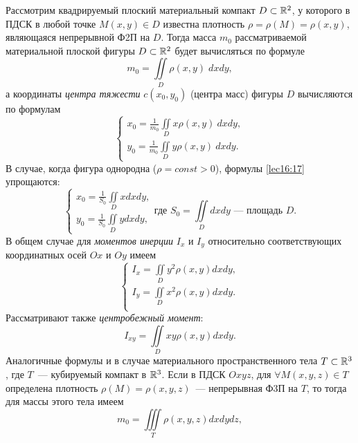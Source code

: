 \documentclass[../../main.tex]{subfiles}
\begin{document}
Рассмотрим квадрируемый плоский материальный компакт
$D \subset \mathbb{R}^{2}$, у которого в ПДСК в любой точке $M(x, y) \in D$ известна
плотность $\rho = \rho(M) = \rho(x,y)$, являющаяся непрерывной Ф2П на $D$. 
Тогда
масса $m_0$ рассматриваемой материальной плоской фигуры $D \subset \mathbb{R}^{2}$
будет вычисляться по формуле
\begin{equation}
\label{lec16:15}
m_0 = \iint\limits_D \rho(x, y) \; dxdy,
\end{equation}
а координаты \emph{центра тяжести} $c(x_0, y_0)$ (центра масс)
фигуры $D$ вычисляются по формулам
\begin{equation}
\label{lec16:16}
\begin{cases}
	x_0 = \frac{1}{m_0}\iint\limits_D x\rho(x,y)\: dx dy,\\
	y_0 = \frac{1}{m_0}\iint\limits_D y\rho(x,y)\: dx dy.
	\end{cases}
\end{equation}
В случае, когда фигура однородна ($\rho=const>0$),
 формулы \eqref{lec16:17} упрощаются:
 \begin{equation*}
 \begin{cases}
 	x_0 = \frac{1}{S_0}\iint\limits_D x dx dy,\\
 	y_0 =\frac{1}{S_0}\iint\limits_D y dx dy,
 	\end{cases}
 \text{где } S_0=\iint\limits_D dxdy\text{~--- площадь }D.
 \end{equation*}
В общем случае для \emph{моментов инерции} $I_x$ и $I_y$ относительно 
соответствующих 
координатных
осей $Ox$ и $Oy$ имеем
\begin{equation}
\label{lec16:17}
\begin{cases}
	I_x = \iint\limits_Dy^2\rho(x, y) dx dy,\\
	I_y = \iint\limits_Dx^2\rho(x, y) dx dy.\\
	\end{cases}
\end{equation}
Рассматривают также \emph{центробежный момент}:
\begin{equation}
\label{lec16:18}
I_{xy} = \iint\limits_Dxy\rho(x, y) dx dy.
\end{equation}
Аналогичные формулы и в случае материального пространственного тела
$T \subset \mathbb{R}^{3}$, где $T$~--- кубируемый компакт в $\mathbb{R}^{3}$.
Если в ПДСК $Oxyz$, для $\forall M(x, y, z) \in T$ определена плотность $\rho 
(M) =
\rho(x, y, z)$~--- непрерывная Ф3П на $T$, то тогда для массы этого тела имеем
\begin{equation}
\label{lec16:19}
m_0 = \iiint\limits_T \rho(x, y, z) dx dy dz,
\end{equation}
\end{document}
